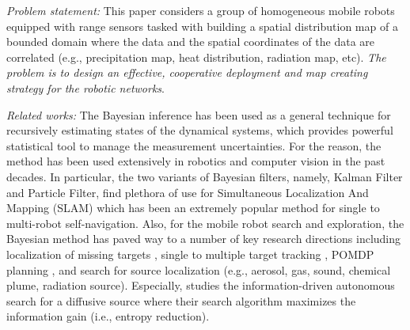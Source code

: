 \documentclass[journal]{IEEEtran}
\begin{document}
\textit{Problem statement:}
This paper considers a group of homogeneous mobile robots equipped with range sensors tasked with building a spatial distribution map of a bounded domain where the data and the spatial coordinates of the data are correlated (e.g., precipitation map, heat distribution, radiation map, etc). \emph{The problem is to design an effective, cooperative deployment and map creating strategy for the robotic networks}.




\textit{Related works:} The Bayesian inference has been used as a general technique for recursively estimating states of the dynamical systems, which provides powerful statistical tool to manage the measurement uncertainties.
For the reason, the method has been used extensively in robotics \cite{thrun2005probabilistic} and computer vision \cite{ponce2011computer} in the past decades. In particular, the two variants of Bayesian filters, namely, Kalman Filter and Particle Filter, find plethora of use for Simultaneous Localization And Mapping (SLAM) which has been an extremely popular method for single to multi-robot self-navigation.
Also, for the mobile robot search and exploration, the Bayesian method has paved way to a number of key research directions including
localization of missing targets \cite{bourgault2003coordinated}, single to multiple target tracking \cite{stone2013bayesian}, POMDP planning \cite{candido2010exploiting}, and 
search for source localization \cite{ristic2010information,valin2007robust} (e.g., aerosol, gas, sound, chemical plume, radiation source). 
Especially, \cite{ristic2010information} studies the information-driven autonomous search for a diffusive source
where their search algorithm maximizes the information gain (i.e., entropy reduction).
\end{document}
